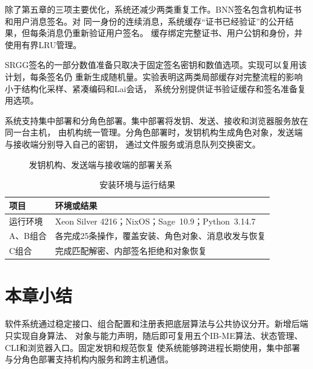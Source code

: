除了第五章的三项主要优化，系统还减少两类重复工作。BNN签名包含机构证书和用户消息签名。对
同一身份的连续消息，系统缓存“证书已经验证”的公开结果，但每条消息仍重新验证用户签名。
缓存绑定完整证书、用户公钥和身份，并使用有界LRU管理。

SRGG签名的一部分数值准备只取决于固定签名密钥和数值选项。实现可以复用该计划，每条签名仍
重新生成随机量。实验表明这两类局部缓存对完整流程的影响小于结构化采样、紧凑编码和Lai会话，
系统分别提供证书验证缓存和签名准备复用选项。

系统支持集中部署和分角色部署。集中部署将发钥、发送、接收和浏览器服务放在同一台主机，
由机构统一管理。分角色部署时，发钥机构生成角色对象，发送端与接收端分别导入自己的密钥，
通过文件服务或消息队列交换密文。

\begin{figure}[H]
\centering
{}
\caption{发钥机构、发送端与接收端的部署关系}
\label{fig:deployment}
\end{figure}



\begin{table}[H]
\centering\small
\caption{安装环境与运行结果}
\label{tab:installation-reproduction}
\begin{tabularx}{\textwidth}{@{}p{}X@{}}
\toprule
\rowcolor{black!8} 项目 & 环境或结果 \\
\midrule
运行环境 & Xeon Silver 4216；NixOS；Sage~10.9；Python~3.14.7 \\
A、B组合 & 各完成25条操作，覆盖安装、角色对象、消息收发与恢复 \\
C组合 & 完成匹配解密、内部签名拒绝和对象恢复 \\
\bottomrule
\end{tabularx}
\end{table}

\section{本章小结}

软件系统通过稳定接口、组合配置和注册表把底层算法与公共协议分开。新增后端只实现自身算法、
对象与能力声明，随后即可复用五个IB-ME算法、状态管理、CLI和浏览器入口。固定发钥和规范恢复
使系统能够跨进程长期使用，集中部署与分角色部署支持机构内服务和跨主机通信。
